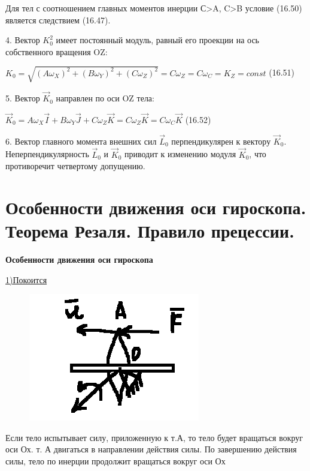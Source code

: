 {\begin{center}
    \par Для тел с соотношением главных моментов инерции С>A, C>B условие (16.50) является следствием (16.47).

    \par 4. Вектор  $K_{0}^{2}$  имеет  постоянный  модуль,  равный его проекции на ось собственного вращения OZ:

    \par $K_{0} = \sqrt{(A\omega_{X})^{2} + (B\omega_{Y})^{2} + (C\omega_{Z})^{2}}  =C\omega_{Z} = C\omega_{C} =K_{Z} = const $ \qquad  (16.51)

    \par 5. Вектор  $\vec{K}_{0}$ направлен по оси OZ тела:
    \par $\vec{K}_{0} = A\omega_{X}\vec{I} + B\omega_{Y}\vec{J} + C\omega_{Z}\vec{K} = C\omega_{Z}\vec{K} = C\omega_{C}\vec{K} $ \qquad  (16.52)

    \par 6. Вектор главного момента внешних сил $\vec{L}_{0}$ перпендикулярен к вектору $\vec{K}_{0}$. Неперпендикулярность  $\vec{L}_{0}$ и  $\vec{K}_{0}$ приводит к изменению модуля  $\vec{K}_{0}$, что противоречит четвертому допущению. 
    
\end{center}
\section{Особенности движения оси гироскопа. Теорема Резаля. Правило прецессии.}
\begin{center}
    \par \textbf{Особенности движения оси гироскопа}
    \par \underline{1)Покоится}
    \begin{figure}[H]
        \centering\includegraphics[scale=0.5]{img/1.jpeg} 
    \end{figure}
    \par Если тело испытывает силу, приложенную к т.А, то тело будет вращаться вокруг оси Ох. т. А двигаться в направлении действия силы. По завершению действия силы, тело по инерции продолжит вращаться вокруг оси Ох


\end{center}}
